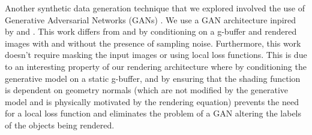 \documentclass[10pt,twocolumn,letterpaper]{article}
\newcommand{\tompson}[1]{{\color{green} JT: #1}}
\begin{document}
Another synthetic data generation technique that we explored involved the use of Generative Adversarial Networks (GANs) \cite{2014arXiv1409.7495G}.  We use a GAN architecture inpired by \cite{DBLP:journals/corr/ShrivastavaPTSW16} and \cite{Bousmalis2016UnsupervisedPD}. This work differs from \cite{Bousmalis2016UnsupervisedPD} and \cite{DBLP:journals/corr/ShrivastavaPTSW16} by conditioning on a g-buffer and rendered images with and without the presence of sampling noise. Furthermore, this work doesn't require masking the input images or using local loss functions. This is due to an interesting property of our rendering architecture where by conditioning the generative model on a static g-buffer, and by ensuring that the shading function is dependent on geometry normals (which are not modified by the generative model and is physically motivated by the rendering equation) 
prevents the need for a local loss function and eliminates the problem of a GAN altering the labels of the objects being rendered.
\end{document}
